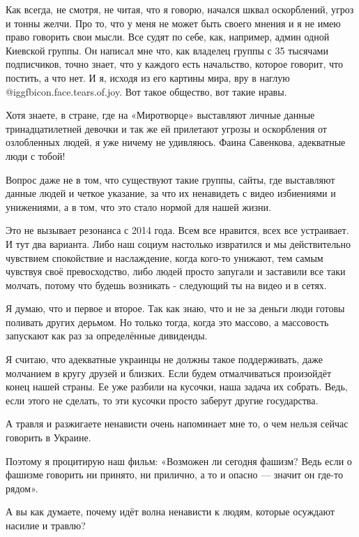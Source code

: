 Как всегда, не смотря, не читая, что я говорю, начался шквал оскорблений, угроз
и тонны желчи. Про то, что у меня не может быть своего мнения и я не имею право
говорить свои мысли. Все судят по себе, как, например,  админ одной Киевской
группы. Он написал мне что, как владелец группы с 35 тысячами подписчиков,
точно знает, что у каждого есть начальство, которое говорит, что постить, а что
нет. И я, исходя из его картины мира, вру в наглую  @igg{fbicon.face.tears.of.joy}. 
Вот такое общество, вот
такие нравы. 

Хотя знаете, в стране, где на «Миротворце» выставляют личные данные
тринадцатилетней девочки и так же ей прилетают угрозы и оскорбления от
озлобленных людей, я уже ничему не удивляюсь. Фаина Савенкова, адекватные люди
с тобой!

Вопрос даже не в том, что существуют такие группы, сайты, где выставляют данные
людей и четкое указание, за что их ненавидеть с видео избиениями и унижениями,
а в том, что это стало нормой для нашей жизни. 

Это не вызывает резонанса с 2014 года. Всем все нравится, всех все устраивает.
И тут два варианта. Либо наш социум настолько извратился и мы действительно
чувствием спокойствие и наслаждение, когда кого-то унижают, тем самым чувствуя
своё превосходство, либо людей просто запугали и заставили все таки молчать,
потому что будешь возникать - следующий ты на видео и в сетях. 

Я думаю, что и первое и второе. Так как знаю, что и не за деньги люди готовы
поливать других дерьмом. Но только тогда, когда это массово, а массовость
запускают как раз за определённые дивиденды. 

Я считаю, что адекватные украинцы не должны такое поддерживать, даже молчанием
в кругу друзей и близких. Если будем отмалчиваться произойдёт конец нашей
страны. Ее уже разбили на кусочки, наша задача их собрать. Ведь, если этого не
сделать, то эти кусочки просто заберут другие государства. 

А травля и разжигаете ненависти очень напоминает мне то, о чем нельзя сейчас
говорить в Украине. 

Поэтому я процитирую наш фильм: «Возможен ли сегодня фашизм? Ведь если о
фашизме говорить ни принято, ни прилично, а то и опасно — значит он где-то
рядом».

А вы как думаете, почему идёт волна ненависти к людям, которые осуждают насилие
и травлю?

